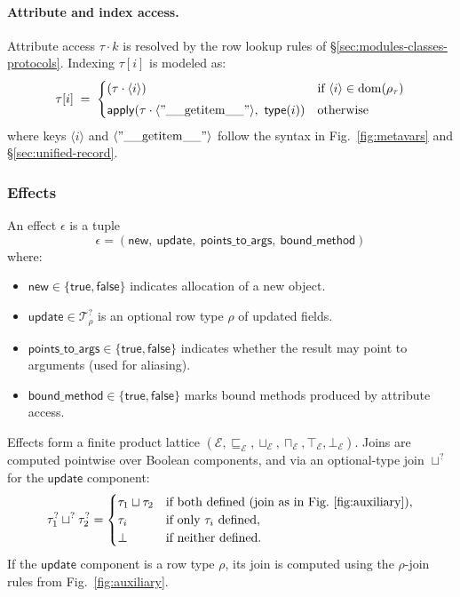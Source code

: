 \paragraph{Attribute and index access.}  
\label{sec:rows-generic-access}
Attribute access $\tau \cdot k$ is resolved by the row lookup rules of \S\ref{sec:modules-classes-protocols}.  
Indexing $\tau[i]$ is modeled as:
\[
\tau[i] \;=\;
\begin{cases}
(\tau \cdot \langle i\rangle) & \text{if $\langle i\rangle \in \mathrm{dom}(\rho_\tau)$} \\[0.3em]
\mathsf{apply}(\tau \cdot \langle \mathrm{"\_\_getitem\_\_"}\rangle,\ \mathsf{type}(i)) & \text{otherwise}
\end{cases}
\]
where keys $\langle i\rangle$ and $\langle \mathrm{"\_\_getitem\_\_"}\rangle$ follow the syntax in Fig.~\ref{fig:metavars} and \S\ref{sec:unified-record}.

\subsubsection*{Effects}
\label{sec:effects}
An effect $\epsilon$ is a tuple
\[
\epsilon = (\mathsf{new},\ \mathsf{update},\ \mathsf{points\_to\_args},\ \mathsf{bound\_method})
\]
where:
\begin{itemize}
  \item $\mathsf{new} \in \{\mathsf{true},\mathsf{false}\}$ indicates allocation of a new object.
  \item $\mathsf{update} \in \mathcal{T}^?_{\rho}$ is an optional row type $\rho$ of updated fields.
  \item $\mathsf{points\_to\_args} \in \{\mathsf{true},\mathsf{false}\}$ indicates whether the result may point to arguments (used for aliasing).
  \item $\mathsf{bound\_method} \in \{\mathsf{true},\mathsf{false}\}$ marks bound methods produced by attribute access.
\end{itemize}

Effects form a finite product lattice $(\mathcal{E}, \sqsubseteq_{\mathcal{E}}, \sqcup_{\mathcal{E}}, \sqcap_{\mathcal{E}}, \top_{\mathcal{E}}, \bot_{\mathcal{E}})$.  
Joins are computed pointwise over Boolean components, and via an optional-type join $\sqcup^?$ for the $\mathsf{update}$ component:
\[
\tau_1^? \sqcup^? \tau_2^? =
\begin{cases}
\tau_1 \sqcup \tau_2 & \text{if both defined (join as in Fig.~\ref{fig:auxiliary})},\\
\tau_i & \text{if only $\tau_i$ defined},\\
\bot & \text{if neither defined}.
\end{cases}
\]
If the $\mathsf{update}$ component is a row type $\rho$, its join is computed using the $\rho$-join rules from Fig.~\ref{fig:auxiliary}.

